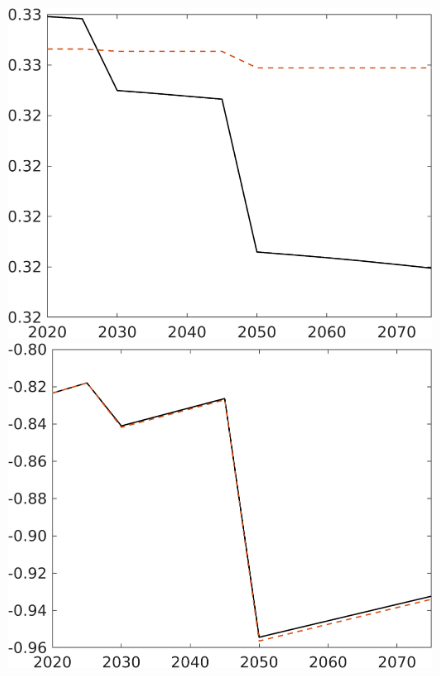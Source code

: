 \begin{figure}[h!!]
\begin{minipage}[]{0.32\textwidth}
	\end{minipage}
	\begin{minipage}[]{0.32\textwidth}
		\includegraphics[width=1\textwidth]{../../codding_model/own_basedOnFried/optimalPol_elastS_DisuSci/figures/all_1705/comp_notaul_OPT_T_NoTaus_hl_spillover0_sep1_BN0_ineq0_etaa0.79.png}
	\end{minipage}
	\begin{minipage}[]{0.32\textwidth}
		\includegraphics[width=1\textwidth]{../../codding_model/own_basedOnFried/optimalPol_elastS_DisuSci/figures/all_1705/comp_notaul_OPT_T_NoTaus_SWF_spillover0_sep1_BN0_ineq0_red0_etaa0.79_lgd0.png}

\end{minipage}
\end{figure}

